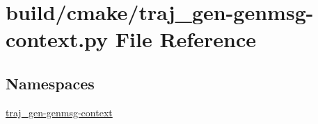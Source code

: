 \hypertarget{traj__gen-genmsg-context_8py}{}\section{build/cmake/traj\+\_\+gen-\/genmsg-\/context.py File Reference}
\label{traj__gen-genmsg-context_8py}
\subsection*{Namespaces}
\begin{DoxyCompactItemize}
\item 
 \hyperlink{namespacetraj__gen-genmsg-context}{traj\+\_\+gen-\/genmsg-\/context}
\end{DoxyCompactItemize}
